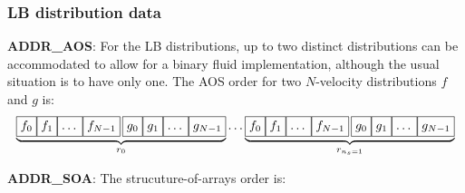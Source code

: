 \subsubsection{LB distribution data}

\textbf{ADDR\_AOS}: For the LB distributions, up to two distinct
distributions can be accommodated to allow for a binary fluid
implementation, although the usual situation is to have only one.
The AOS order for two $N$-velocity distributions $f$ and $g$ is:
\[
\underbrace{
\boxed{f_0\vphantom{f_{N-1}}}    \boxed{f_1\vphantom{f_{N-1}}}
\boxed{\ldots\vphantom{f_{N-1}}} \boxed{f_{N-1}} \,
\boxed{g_0\vphantom{f_{N-1}}}        \boxed{g_1\vphantom{f_{N-1}}}
\boxed{\ldots\vphantom{f_{N-1}}} \boxed{g_{N-1}\vphantom{f_{N-1}}}}_{r_0}
\ldots
\underbrace{
\boxed{f_0\vphantom{f_{N-1}}}    \boxed{f_1\vphantom{f_{N-1}}}
\boxed{\ldots\vphantom{f_{N-1}}} \boxed{f_{N-1}} \,
\boxed{g_0\vphantom{f_{N-1}}}        \boxed{g_1\vphantom{f_{N-1}}}
\boxed{\ldots\vphantom{f_{N-1}}} \boxed{g_{N-1}\vphantom{f_{N-1}}}}_{r_{n_s=1}}
\]

\textbf{ADDR\_SOA}: The strucuture-of-arrays order is:

